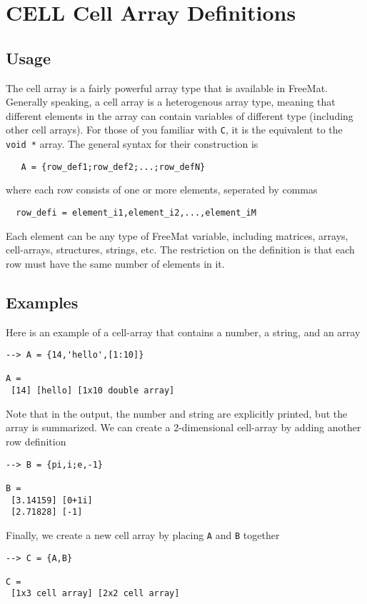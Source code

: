 \section{CELL Cell Array Definitions}

\subsection{Usage}

The cell array is a fairly powerful array type that is available
in FreeMat.  Generally speaking, a cell array is a heterogenous
array type, meaning that different elements in the array can
contain variables of different type (including other cell arrays).
For those of you familiar with \verb|C|, it is the equivalent to the
\verb|void *| array.  The general syntax for their construction is
\begin{verbatim}
   A = {row_def1;row_def2;...;row_defN}
\end{verbatim}
where each row consists of one or more elements, seperated by
commas
\begin{verbatim}
  row_defi = element_i1,element_i2,...,element_iM
\end{verbatim}
Each element can be any type of FreeMat variable, including
matrices, arrays, cell-arrays, structures, strings, etc.  The
restriction on the definition is that each row must have the
same number of elements in it.
\subsection{Examples}

Here is an example of a cell-array that contains a number,
a string, and an array
\begin{verbatim}
--> A = {14,'hello',[1:10]}

A = 
 [14] [hello] [1x10 double array] 
\end{verbatim}
Note that in the output, the number and string are explicitly
printed, but the array is summarized.
We can create a 2-dimensional cell-array by adding another
row definition
\begin{verbatim}
--> B = {pi,i;e,-1}

B = 
 [3.14159] [0+1i] 
 [2.71828] [-1] 
\end{verbatim}
Finally, we create a new cell array by placing \verb|A| and \verb|B|
together
\begin{verbatim}
--> C = {A,B}

C = 
 [1x3 cell array] [2x2 cell array] 
\end{verbatim}
